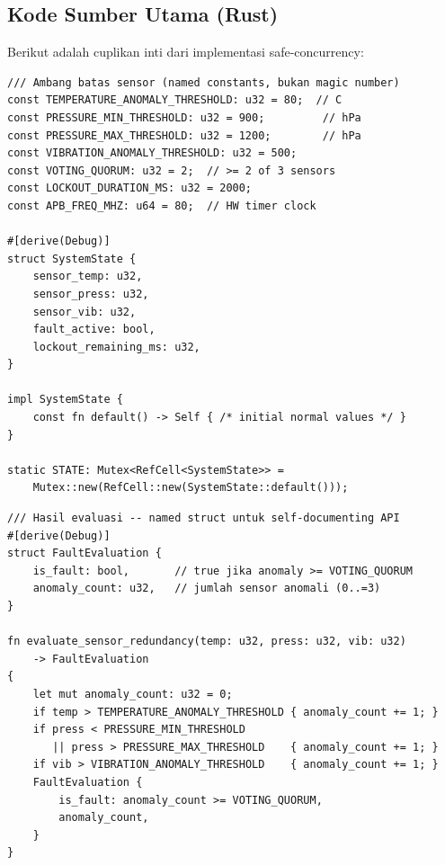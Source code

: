 \documentclass[12pt,a4paper]{article}
\begin{document}
\vspace{0.3cm}

\subsection{Kode Sumber Utama (Rust)}

Berikut adalah cuplikan inti dari implementasi safe-concurrency:

\begin{lstlisting}[caption={Konstanta bernama dan shared state dilindungi Mutex (zero-magic-number).}]
/// Ambang batas sensor (named constants, bukan magic number)
const TEMPERATURE_ANOMALY_THRESHOLD: u32 = 80;  // C
const PRESSURE_MIN_THRESHOLD: u32 = 900;         // hPa
const PRESSURE_MAX_THRESHOLD: u32 = 1200;        // hPa
const VIBRATION_ANOMALY_THRESHOLD: u32 = 500;
const VOTING_QUORUM: u32 = 2;  // >= 2 of 3 sensors
const LOCKOUT_DURATION_MS: u32 = 2000;
const APB_FREQ_MHZ: u64 = 80;  // HW timer clock

#[derive(Debug)]
struct SystemState {
    sensor_temp: u32,
    sensor_press: u32,
    sensor_vib: u32,
    fault_active: bool,
    lockout_remaining_ms: u32,
}

impl SystemState {
    const fn default() -> Self { /* initial normal values */ }
}

static STATE: Mutex<RefCell<SystemState>> =
    Mutex::new(RefCell::new(SystemState::default()));
\end{lstlisting}

\newpage

\begin{lstlisting}[caption={Voting-based redundancy dengan named struct return (bukan bare tuple).}]
/// Hasil evaluasi -- named struct untuk self-documenting API
#[derive(Debug)]
struct FaultEvaluation {
    is_fault: bool,       // true jika anomaly >= VOTING_QUORUM
    anomaly_count: u32,   // jumlah sensor anomali (0..=3)
}

fn evaluate_sensor_redundancy(temp: u32, press: u32, vib: u32)
    -> FaultEvaluation
{
    let mut anomaly_count: u32 = 0;
    if temp > TEMPERATURE_ANOMALY_THRESHOLD { anomaly_count += 1; }
    if press < PRESSURE_MIN_THRESHOLD
       || press > PRESSURE_MAX_THRESHOLD    { anomaly_count += 1; }
    if vib > VIBRATION_ANOMALY_THRESHOLD    { anomaly_count += 1; }
    FaultEvaluation {
        is_fault: anomaly_count >= VOTING_QUORUM,
        anomaly_count,
    }
}
\end{lstlisting}

\newpage
\end{document}
